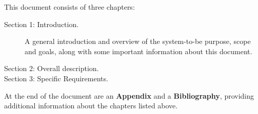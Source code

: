 This document consists of three chapters:

\begin{description}
\item[Section 1: Introduction.] A general introduction and overview of the system-to-be purpose, scope and goals, along with some important information about this document.
\item[Section 2: Overall description.]
\item[Section 3: Specific Requirements.]
\end{description}

At the end of the document are an \textbf{Appendix} and a \textbf{Bibliography}, providing additional information about the chapters listed above.